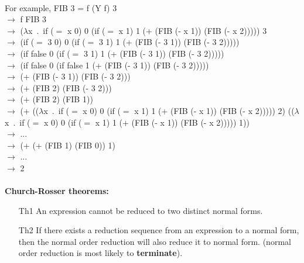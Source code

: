 \documentclass[11pt]{article}
\begin{document}
\\ For example, FIB 3 = f (Y f) 3
\\ $\rightarrow$ f FIB 3
\\ $\rightarrow$ ($\lambda$x\ .\ if ($=$ x 0) 0 (if ($=$ x 1) 1 (+ (FIB (- x 1)) (FIB (- x 2))))) 3
\\ $\rightarrow$ (if ($=$ 3 0) 0 (if ($=$ 3 1) 1 (+ (FIB (- 3 1)) (FIB (- 3 2)))))
\\ $\rightarrow$ (if false 0 (if ($=$ 3 1) 1 (+ (FIB (- 3 1)) (FIB (- 3 2)))))
\\ $\rightarrow$ (if false 0 (if false 1 (+ (FIB (- 3 1)) (FIB (- 3 2)))))
\\ $\rightarrow$ (+ (FIB (- 3 1)) (FIB (- 3 2)))
\\ $\rightarrow$ (+ (FIB 2) (FIB (- 3 2)))
\\ $\rightarrow$ (+ (FIB 2) (FIB 1))
\\ $\rightarrow$ (+ (($\lambda$x\ .\ if ($=$ x 0) 0 (if ($=$ x 1) 1 (+ (FIB (- x 1)) (FIB (- x 2))))) 2) (($\lambda$x\ .\ if ($=$ x 0) 0 (if ($=$ x 1) 1 (+ (FIB (- x 1)) (FIB (- x 2))))) 1))
\\ $\rightarrow$ ...
\\ $\rightarrow$ (+ (+ (FIB 1) (FIB 0)) 1)
\\ $\rightarrow$ ...
\\ $\rightarrow$ 2
\\\\ \textbf{Church-Rosser theorems:}
\begin{itemize}
    \item [Th1] An expression cannot be reduced to two distinct normal forms.
    \item [Th2] If there exists a reduction sequence from an expression to a normal form, then the normal order reduction will also reduce it to normal form. (normal order reduction is most likely to \textbf{terminate}).
\end{itemize}
\end{document}
